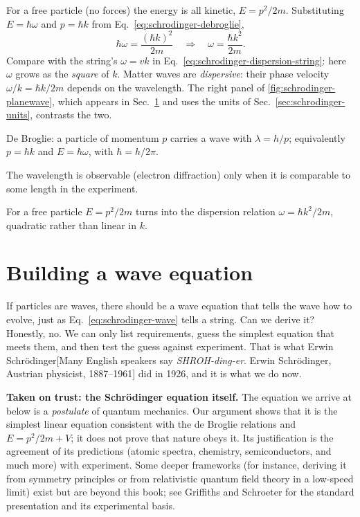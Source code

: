 For a free particle (no forces) the energy is all kinetic, $E=p^2/2m$. Substituting $E=\hbar\omega$ and $p=\hbar k$ from Eq.~\eqref{eq:schrodinger-debroglie},
\begin{equation}
\hbar\omega=\frac{(\hbar k)^2}{2m}
\quad\Longrightarrow\quad
\omega=\frac{\hbar k^2}{2m}.
\label{eq:schrodinger-free-dispersion}
\end{equation}
Compare with the string's $\omega=vk$ in Eq.~\eqref{eq:schrodinger-dispersion-string}: here $\omega$ grows as the \emph{square} of $k$. Matter waves are \emph{dispersive}: their phase velocity $\omega/k=\hbar k/2m$ depends on the wavelength. The right panel of \cref{fig:schrodinger-planewave}, which appears in Sec.~\ref{sec:schrodinger-tdse} and uses the units of Sec.~\ref{sec:schrodinger-units}, contrasts the two.

\begin{keyideas}
\item De Broglie: a particle of momentum $p$ carries a wave with $\lambda=h/p$; equivalently $p=\hbar k$ and $E=\hbar\omega$, with $\hbar=h/2\pi$.
\item The wavelength is observable (electron diffraction) only when it is comparable to some length in the experiment.
\item For a free particle $E=p^2/2m$ turns into the dispersion relation $\omega=\hbar k^2/2m$, quadratic rather than linear in $k$.
\end{keyideas}

\section{Building a wave equation}\label{sec:schrodinger-tdse}

If particles are waves, there should be a wave equation that tells the wave how to evolve, just as Eq.~\eqref{eq:schrodinger-wave} tells a string. Can we derive it? Honestly, no. We can only list requirements, guess the simplest equation that meets them, and then test the guess against experiment. That is what Erwin Schr\"odinger[Many English speakers say \emph{SHROH-ding-er}. Erwin Schr\"odinger, Austrian physicist, 1887--1961] did in 1926, and it is what we do now.

\begin{beyond}
\textbf{Taken on trust: the Schr\"odinger equation itself.} The equation we arrive at below is a \emph{postulate} of quantum mechanics. Our argument shows that it is the simplest linear equation consistent with the de Broglie relations and $E=p^2/2m+V$; it does not prove that nature obeys it. Its justification is the agreement of its predictions (atomic spectra, chemistry, semiconductors, and much more) with experiment. Some deeper frameworks (for instance, deriving it from symmetry principles or from relativistic quantum field theory in a low-speed limit) exist but are beyond this book; see Griffiths and Schroeter \cite{griffiths} for the standard presentation and its experimental basis.
\end{beyond}

